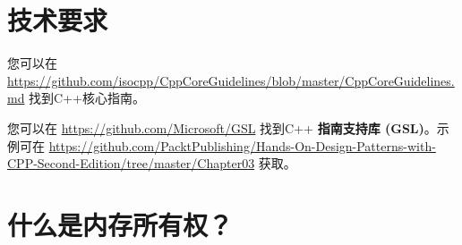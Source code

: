 \section{技术要求}

您可以在 \url{https://github.com/isocpp/CppCoreGuidelines/blob/master/CppCoreGuidelines.md} 找到C++核心指南。

您可以在 \url{https://github.com/Microsoft/GSL} 找到C++ \textbf{指南支持库 (GSL)}。示例可在 \url{https://github.com/PacktPublishing/Hands-On-Design-Patterns-with-CPP-Second-Edition/tree/master/Chapter03} 获取。

\section{什么是内存所有权？}

